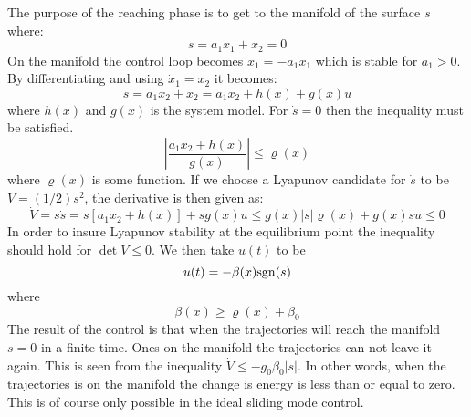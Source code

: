The purpose of the reaching phase is to get to the manifold of the surface $s$ where:
\begin{equation}
  s = a_1 x_1 + x_2 = 0
\end{equation}
On the manifold the control loop becomes $ \dot{x}_1 = - a_1 x_1$ which is stable for $ a_1 > 0$.
By differentiating and using $ \dot{x}_1 = x_2 $ it becomes:
\begin{equation}
        \dot{s} = a_1 x_2 + \dot{x}_2 = a_1 x_2 + h(x) + g(x)u
\end{equation}
where $h(x)$ and $g(x)$ is the system model. For $\dot{s} = 0$ then the inequality must be satisfied.
\begin{equation}
        \left\vert \frac{a_1 x_2 + h(x)}{g(x)} \right\vert \leq \varrho(x)
\end{equation}
where $\varrho(x)$ is some function. If we choose a Lyapunov candidate for $\dot{s}$ to be $V = (1/2)s^2$, the derivative is then given as:
\begin{equation}
  \dot{V} = s \dot{s} =  s[a_1 x_2 + h(x)] + s g(x) u \leq g(x) \vert s\vert \varrho(x) + g(x) s u \leq 0
\end{equation}
In order to insure Lyapunov stability at the equilibrium point the inequality should hold for $\det{V} \leq 0$. We then take $u(t)$ to be
\begin{equation}
  u(t) = -\beta(x) \mathrm{sgn}(s)
  \label{eq:control_ideal}
\end{equation}
where
\begin{equation}
  \beta (x) \geq \varrho (x) + \beta_0
\end{equation}
The result of the control is that when the trajectories will reach the manifold $s=0$ in a finite time. Ones on the manifold the trajectories can not leave it again. This is seen from the inequality $\dot{V} \leq -g_0 \beta_0 \vert s \vert$. In other words, when the trajectories is on the manifold the change is energy is less than or equal to zero. This is of course only possible in the ideal sliding mode control. 

